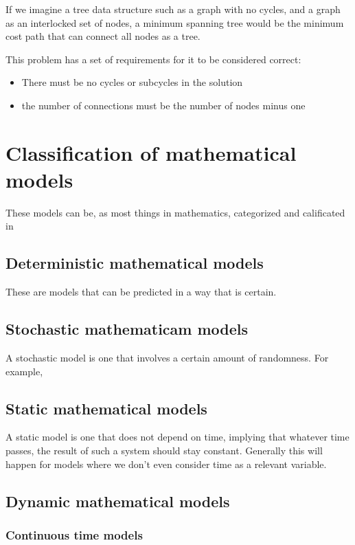 \documentclass{textbook}
\begin{document}
If we imagine a tree data structure such as a graph with no cycles, and a graph as an interlocked set of
nodes, a minimum spanning tree would be the minimum cost path that can connect all nodes as a tree.

This problem has a set of requirements for it to be considered correct:

\begin{itemize}
    \item There must be no cycles or subcycles in the solution
    \item the number of connections must be the number of nodes minus one
\end{itemize}

\section{Classification of mathematical models}

These models can be, as most things in mathematics, categorized and calificated in 

\subsection{Deterministic mathematical models}

These are models that can be predicted in a way that is certain.

\subsection{Stochastic mathematicam models}

A stochastic model is one that involves a certain amount of randomness. For example, 

\subsection{Static mathematical models}

A static model is one that does not depend on time, implying that whatever time passes, the result of
such a system should stay constant. Generally this will happen for models where we don't even consider time as a 
relevant variable.

\subsection{Dynamic mathematical models}
\subsubsection{Continuous time models}
\end{document}
